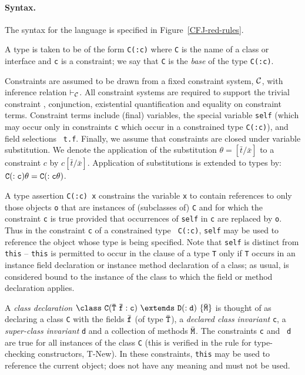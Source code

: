 \begin{figure*}
\caption{Reduction rules for Constrained FJ}\label{CFJ-red-rules}
\end{figure*}

\paragraph{Syntax.}
The syntax for the language is specified in Figure~\ref{CFJ-red-rules}.

A type is taken to be of the form {\tt C(:c)} where {\tt C} is the
name of a class or interface and {\tt c} is a constraint; we say that
{\tt C} is the {\em base} of the type {\tt C(:c)}.

Constraints are assumed to be drawn from a fixed constraint system,
$\cal C$, with inference relation $\vdash_{\cal C}$. All constraint
systems are required to support the trivial constraint \true,
conjunction, existential quantification and equality on constraint
terms. Constraint terms include (final) variables, the special
variable {\tt self} (which may occur only in constraints {\tt c} which
occur in a constrained type {\tt C(:c)}), and field selections {\tt
t.f}. Finally, we assume that constraints are closed under variable
substitution. We denote the application of the substitution
$\theta=[\bar{t}/\bar{x}]$ to a constraint $c$ by
$c[\bar{t}/\bar{x}]$. Application of substitutions is extended to
types by: ${\tt C(:c)\theta}={\tt C(:c\theta)}$.

A type assertion {\tt C(:c) x} constrains the variable {\tt x} to
contain references to only those objects {\tt o} that are instances of
(subclasses of) {\tt C} and for which the constraint {\tt c} is true
provided that occurrences of {\tt self} in {\tt c} are replaced by
{\tt o}. Thus in the constraint {\tt c} of a constrained type {\tt
C(:c)}, {\tt self} may be used to reference the object whose type is
being specified. Note that {\tt self} is distinct from {\tt this} --
{\tt this} is permitted to occur in the clause of a type {\tt T} only
if {\tt T} occurs in an instance field declaration or instance method
declaration of a class; as usual, \this{} is considered bound to the
instance of the class to which the field or method declaration
applies.

A {\em class declaration} $\tt\class \ C(\bar{T}\ \bar{f}:c)\ \extends\ D(:d)\
\{\bar{M}\}$ is thought of as declaring a class {\tt C} with the
fields $\bar{\tt f}$ (of type $\bar{\tt T}$), a {\em declared class
invariant} {\tt c}, a {\em super-class invariant} {\tt d} and a
collection of methods $\bar{\tt M}$. The constraints {\tt c} and {\tt
d} are true for all instances of the class {\tt C} (this is verified
in the rule for type-checking constructors, T-New).  In these
constraints, {\tt this} may be used to reference the current object;
\self{} does not have any meaning and must not be used.


